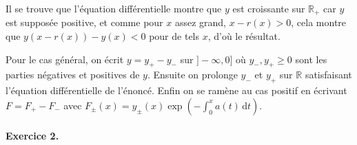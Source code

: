 Il se trouve que l'équation différentielle montre que $y$ est croissante sur $\mathbb{R}_+$ car $y$ est supposée positive, et comme pour $x$ assez grand, $x-r(x)>0$, cela montre que $y(x-r(x))-y(x)<0$ pour de tels $x$, d'où le résultat. 

Pour le cas général, on écrit $y=y_+-y_-$ sur $]-\infty,0]$ où $y_-, y_+ \geqslant 0$ sont les parties négatives et positives de $y$. Ensuite on prolonge $y_-$ et $y_+$ sur $\mathbb{R}$ satisfaisant l'équation différentielle de l'énoncé. Enfin on se ramène au cas positif en écrivant $F=F_+-F_-$ avec $F_{\pm}(x)=y_{\pm}(x)\exp\left(-\int_0^xa(t)\,\mathrm{d}t\right)$.  

\paragraph{Exercice 2.}